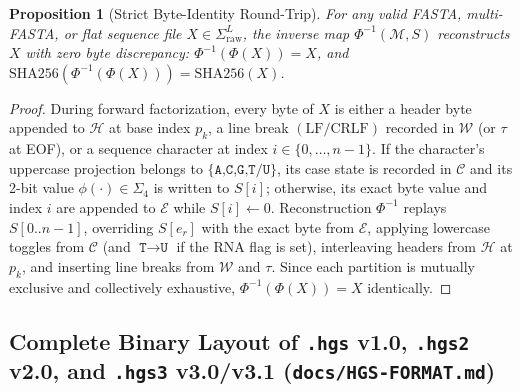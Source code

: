 \documentclass[10pt]{article}
\newtheorem{proposition}{Proposition}
\theoremstyle{definition}
\begin{document}
\begin{proposition}[Strict Byte-Identity Round-Trip]
For any valid FASTA, multi-FASTA, or flat sequence file $X \in \Sigma_{\text{raw}}^L$, the inverse map $\Phi^{-1}(\mathcal{M}, S)$ reconstructs $X$ with zero byte discrepancy: $\Phi^{-1}(\Phi(X)) = X$, and $\text{SHA256}(\Phi^{-1}(\Phi(X))) = \text{SHA256}(X)$.
\end{proposition}
\begin{proof}
During forward factorization, every byte of $X$ is either a header byte appended to $\mathcal{H}$ at base index $p_k$, a line break $(\text{LF}/\text{CRLF})$ recorded in $\mathcal{W}$ (or $\tau$ at EOF), or a sequence character at index $i \in \{0,\dots,n-1\}$. If the character's uppercase projection belongs to $\{\texttt{A,C,G,T/U}\}$, its case state is recorded in $\mathcal{C}$ and its 2-bit value $\phi(\cdot) \in \Sigma_4$ is written to $S[i]$; otherwise, its exact byte value and index $i$ are appended to $\mathcal{E}$ while $S[i] \leftarrow 0$. Reconstruction $\Phi^{-1}$ replays $S[0..n-1]$, overriding $S[e_r]$ with the exact byte from $\mathcal{E}$, applying lowercase toggles from $\mathcal{C}$ (and $\texttt{T}\to\texttt{U}$ if the RNA flag is set), interleaving headers from $\mathcal{H}$ at $p_k$, and inserting line breaks from $\mathcal{W}$ and $\tau$. Since each partition is mutually exclusive and collectively exhaustive, $\Phi^{-1}(\Phi(X)) = X$ identically.
\end{proof}

\subsection{Complete Binary Layout of \texttt{.hgs} v1.0, \texttt{.hgs2} v2.0, and \texttt{.hgs3} v3.0/v3.1 (\texttt{docs/HGS-FORMAT.md})}
\end{document}
